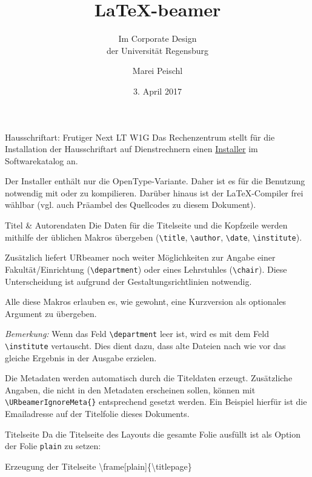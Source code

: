 \documentclass[ngerman,%
	aspectratio=169,%
	colors={rz,faculties},%
	framenumber=true,%
	externalize=true,
	]{URbeamer}
\title{\LaTeX-beamer}
\subtitle{Im Corporate Design\\\hspace*{\fill} der Universität Regensburg}
\date{3. April 2017}
\author[Marei Peischl]{Marei Peischl\URbeamerIgnoreMeta{ (\url{TeX@mareipeischl.de})}}%
\newcommand*\code[1]{\texttt{#1}}
\begin{document}
	
\frame[plain]{\titlepage}

\begin{frame}{Hausschriftart: Frutiger Next LT W1G}
	Das Rechenzentrum stellt für die Installation der Hausschriftart auf Dienstrechnern einen \href{http://www.uni-regensburg.de/rechenzentrum/software/softwarekatalog/produktdetails/index.html?product_hash=cc47a29792efce83538cdf5660de6f5d}{Installer} im Softwarekatalog an. 

	\medskip
	Der Installer enthält nur die OpenType-Variante. Daher ist es für die Benutzung notwendig mit  oder  zu kompilieren. Darüber hinaus ist der \LaTeX-Compiler frei wählbar (vgl. auch Präambel des Quellcodes zu diesem Dokument).
\end{frame}

\begin{frame}{Titel \& Autorendaten}
	Die Daten für die Titelseite und die Kopfzeile werden mithilfe der üblichen Makros übergeben (\code{\textbackslash{}title}, \code{\textbackslash{}author}, \code{\textbackslash{}date}, \code{\textbackslash{}institute}).
	
	\smallskip
	Zusätzlich liefert URbeamer noch weiter Möglichkeiten zur Angabe einer Fakultät/Einrichtung (\code{\textbackslash{}department}) oder eines Lehrstuhles (\code{\textbackslash{}chair}). Diese Unterscheidung ist aufgrund der Gestaltungsrichtlinien notwendig.

	\smallskip	
	Alle diese Makros erlauben es, wie gewohnt, eine Kurzversion als optionales Argument zu übergeben.
	
	\medskip
	\small
	\emph{Bemerkung:} Wenn das Feld \code{\textbackslash{}department} leer ist, wird es mit dem Feld \code{\textbackslash{}institute} vertauscht. Dies dient dazu, dass alte Dateien nach wie vor das gleiche Ergebnis in der Ausgabe erzielen.
	
	\smallskip
	\normalsize
	Die Metadaten werden automatisch durch die Titeldaten erzeugt. Zusätzliche Angaben, die nicht in den Metadaten erscheinen sollen, können mit \code{\textbackslash{}URbeamerIgnoreMeta\{\}} entsprechend gesetzt werden. Ein Beispiel hierfür ist die Emailadresse auf der Titelfolie dieses Dokuments.
\end{frame}

\begin{frame}{Titelseite}
	Da die Titelseite des Layouts die gesamte Folie ausfüllt ist als Option der Folie \code{plain} zu setzen:
	
	\begin{block}{Erzeugung der Titelseite}
	 \ttfamily\textbackslash{}frame[plain]\{\textbackslash{}titlepage\}
	 \end{block}
\end{frame}
\end{document}
